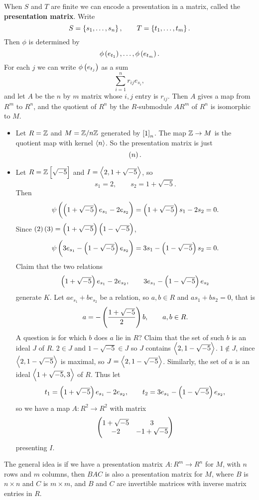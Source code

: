 \pagebreak

When $ S $ and $ T $ are finite we can encode a presentation in a matrix, called the \textbf{presentation matrix}. Write
$$ S = \cbr{s_1, \dots, s_n}, \qquad T = \cbr{t_1, \dots, t_m}. $$
Then $ \phi $ is determined by
$$ \phi\br{e_{t_1}}, \dots, \phi\br{e_{t_m}}. $$
For each $ j $ we can write $ \phi\br{e_{t_j}} $ as a sum
$$ \sum_{i = 1}^n r_{ij}e_{s_i}, $$
and let $ A $ be the $ n $ by $ m $ matrix whose $ i, j $ entry is $ r_{ij} $. Then $ A $ gives a map from $ R^m $ to $ R^n $, and the quotient of $ R^n $ by the $ R $-submodule $ AR^m $ of $ R^n $ is isomorphic to $ M $.

\begin{example*}
\hfill
\begin{itemize}
\item Let $ R = \mathbb{Z} $ and $ M = \mathbb{Z} / n\mathbb{Z} $ generated by $ \sbr{1}_n $. The map $ \mathbb{Z} \to M $ is the quotient map with kernel $ \left\langle n \right\rangle $. So the presentation matrix is just
$$ \br{n}. $$
\item Let $ R = \Z\sbr{\sqrt{-5}} $ and $ I = \left\langle 2, 1 + \sqrt{-5} \right\rangle $, so
$$ s_1 = 2, \qquad s_2 = 1 + \sqrt{-5}. $$
Then
$$ \psi\br{\br{1 + \sqrt{-5}}e_{s_1} - 2e_{s_2}} = \br{1 + \sqrt{-5}}s_1 - 2s_2 = 0. $$
Since $ \br{2}\br{3} = \br{1 + \sqrt{-5}}\br{1 - \sqrt{-5}} $,
$$ \psi\br{3e_{s_1} - \br{1 - \sqrt{-5}}e_{s_2}} = 3s_1 - \br{1 - \sqrt{-5}}s_2 = 0. $$
Claim that the two relations
$$ \br{1 + \sqrt{-5}}e_{s_1} - 2e_{s_2}, \qquad 3e_{s_1} - \br{1 - \sqrt{-5}}e_{s_2} $$
generate $ K $. Let $ ae_{s_1} + be_{s_2} $ be a relation, so $ a, b \in R $ and $ as_1 + bs_2 = 0 $, that is
$$ a = -\br{\dfrac{1 + \sqrt{-5}}{2}}b, \qquad a, b \in R. $$
A question is for which $ b $ does $ a $ lie in $ R $? Claim that the set of such $ b $ is an ideal $ J $ of $ R $. $ 2 \in J $ and $ 1 - \sqrt{-5} \in J $ so $ J $ contains $ \left\langle 2, 1 - \sqrt{-5} \right\rangle $. $ 1 \notin J $, since $ \left\langle 2, 1 - \sqrt{-5} \right\rangle $ is maximal, so $ J = \left\langle 2, 1 - \sqrt{-5} \right\rangle $. Similarly, the set of $ a $ is an ideal $ \left\langle 1 + \sqrt{-5}, 3 \right\rangle $ of $ R $. Thus let
$$ t_1 = \br{1 + \sqrt{-5}}e_{s_1} - 2e_{s_2}, \qquad t_2 = 3e_{s_1} - \br{1 - \sqrt{-5}}e_{s_2}, $$
so we have a map $ A : R^2 \to R^2 $ with matrix
$$ \begin{pmatrix} 1 + \sqrt{-5} & 3 \\ -2 & -1 + \sqrt{-5} \end{pmatrix} $$
presenting $ I $.
\end{itemize}
\end{example*}

The general idea is if we have a presentation matrix $ A : R^m \to R^n $ for $ M $, with $ n $ rows and $ m $ columns, then $ BAC $ is also a presentation matrix for $ M $, where $ B $ is $ n \times n $ and $ C $ is $ m \times m $, and $ B $ and $ C $ are invertible matrices with inverse matrix entries in $ R $.

